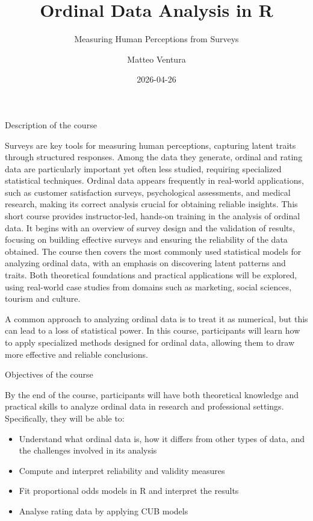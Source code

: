 \documentclass[
  letterpaper,
  DIV=11,
  numbers=noendperiod]{scrartcl}
\title{Ordinal Data Analysis in R}
\subtitle{Measuring Human Perceptions from Surveys}
\author{Matteo Ventura}
\date{2026-04-26}
\providecommand{\tightlist}{%
  \setlength{\itemsep}{0pt}\setlength{\parskip}{0pt}}\usepackage{longtable,booktabs,array}
\begin{document}
\maketitle
\ifdefined\Shaded\renewenvironment{Shaded}{\begin{tcolorbox}[enhanced, breakable, interior hidden, frame hidden, borderline west={3pt}{0pt}{shadecolor}, boxrule=0pt, sharp corners]}{\end{tcolorbox}}\fi

Description of the course

Surveys are key tools for measuring human perceptions, capturing latent
traits through structured responses. Among the data they generate,
ordinal and rating data are particularly important yet often less
studied, requiring specialized statistical techniques. Ordinal data
appears frequently in real-world applications, such as customer
satisfaction surveys, psychological assessments, and medical research,
making its correct analysis crucial for obtaining reliable insights.
This short course provides instructor-led, hands-on training in the
analysis of ordinal data. It begins with an overview of survey design
and the validation of results, focusing on building effective surveys
and ensuring the reliability of the data obtained. The course then
covers the most commonly used statistical models for analyzing ordinal
data, with an emphasis on discovering latent patterns and traits. Both
theoretical foundations and practical applications will be explored,
using real-world case studies from domains such as marketing, social
sciences, tourism and culture.

A common approach to analyzing ordinal data is to treat it as numerical,
but this can lead to a loss of statistical power. In this course,
participants will learn how to apply specialized methods designed for
ordinal data, allowing them to draw more effective and reliable
conclusions.

Objectives of the course

By the end of the course, participants will have both theoretical
knowledge and practical skills to analyze ordinal data in research and
professional settings. Specifically, they will be able to:

\begin{itemize}
\tightlist
\item
  Understand what ordinal data is, how it differs from other types of
  data, and the challenges involved in its analysis
\item
  Compute and interpret reliability and validity measures
\item
  Fit proportional odds models in R and interpret the results
\item
  Analyse rating data by applying CUB models
\end{itemize}
\end{document}
